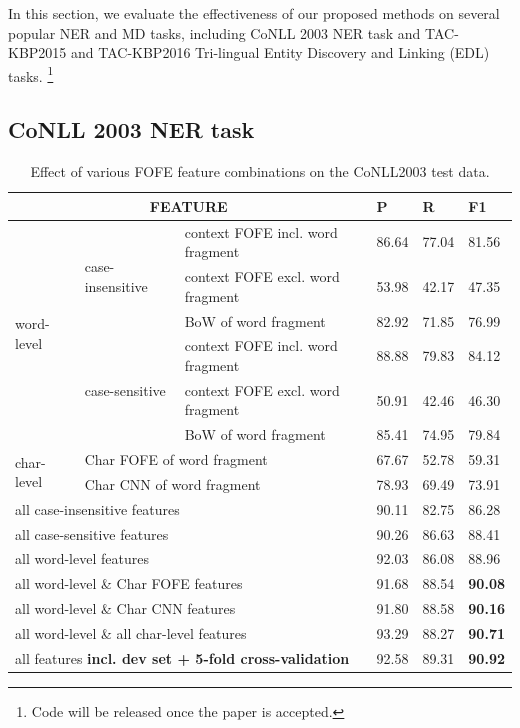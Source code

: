 \documentclass[11pt,a4paper]{article}
\begin{document}
In this section, we evaluate the effectiveness of our proposed methods on several popular NER and MD tasks, including CoNLL 2003 NER task and 
TAC-KBP2015 and TAC-KBP2016 Tri-lingual Entity Discovery and Linking (EDL) tasks.
\footnote{Code will be released once the paper is accepted.}

\subsection{CoNLL 2003 NER task}

\begin{table}[h!]
	\centering
	\begin{tabular}{|l|l|l|lll|}
		\hline
		\multicolumn{3}{|c|}{FEATURE} & P & R & F1\\
		\hline\hline
		\multirow{6}{*}{word-level} & 
		\multirow{3}{*}{case-insensitive} &
		context FOFE incl. word fragment & 86.64 & 77.04 & 81.56 \\
		& &context FOFE excl. word fragment & 53.98 & 42.17 & 47.35  \\
		& & BoW of word fragment & 82.92 & 71.85 & 76.99  \\ \cline{2-6} 
		& \multirow{3}{*}{case-sensitive} & 
		context FOFE incl. word fragment & 88.88 & 79.83 &84.12  \\
		& &context FOFE excl. word fragment & 50.91 & 42.46 & 46.30  \\
		& & BoW of word fragment & 85.41 & 74.95 & 79.84  \\ \hline
		\multirow{2}{*}{char-level} &
		\multicolumn{2}{l|}{Char FOFE of word fragment} & 67.67 & 52.78 & 59.31  \\
		& \multicolumn{2}{l|}{Char CNN of word fragment} & 78.93 & 69.49 & 73.91 \\ \hline
		\multicolumn{3}{|l|}{all case-insensitive features} &  90.11 & 82.75 &  86.28  \\ 
		\multicolumn{3}{|l|}{all case-sensitive features} & 90.26 & 86.63 & 88.41 \\ 
		\multicolumn{3}{|l|}{all word-level features} & 92.03 & 86.08 & 88.96  \\ \hline
		\multicolumn{3}{|l|}{all word-level \& Char FOFE features} & 91.68 &  88.54 & \bf 90.08 \\
		\multicolumn{3}{|l|}{all word-level \& Char CNN features} & 91.80 & 88.58 & \bf 90.16 \\ \hline
		\multicolumn{3}{|l|}{all word-level \& all char-level features}  & 93.29 &  88.27 &  \bf 90.71  \\
		\multicolumn{3}{|l|}{all features \bf{incl. dev set} + 5-fold cross-validation} & 92.58 &  89.31 &  \bf 90.92  \\
		\hline
	\end{tabular}
	\caption{Effect of various FOFE feature combinations on the CoNLL2003 test data.}
	\label{tbl:feat-cmp:CoNLL03}
\end{table}
\end{document}
